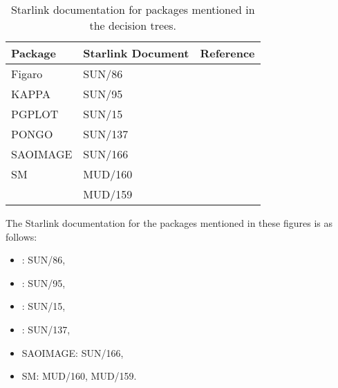 
\begin{latexonly}
\begin{table}[htbp]

\begin{center}
\begin{tabular}{llc}
Package      & Starlink Document &  Reference \\ 
\hline
Figaro       & SUN/86   & \cite{FIGARO}   \\
KAPPA        & SUN/95   & \cite{KAPPA}    \\
PGPLOT       & SUN/15   & \cite{PGPLOT}   \\
PONGO        & SUN/137  & \cite{PONGO}    \\
SAOIMAGE     & SUN/166  & \cite{SAOIMAGE} \\
SM           & MUD/160  & \cite{MUD160}   \\
             & MUD/159  & \cite{MUD159}   \\
\end{tabular}
\end{center}

\caption[Starlink documentation for packages mentioned in the decision
trees.]{Starlink documentation for packages mentioned in the decision
trees. \label{STARDOC} }

\end{table}
\end{latexonly}

\begin{htmlonly}

The Starlink documentation for the packages mentioned in these figures
is as follows:


\begin{itemize}

  \item {}:    SUN/86\cite{FIGARO},
  \item {}:     SUN/95\cite{KAPPA},
  \item {}:    SUN/15\cite{PGPLOT},
  \item {}:    SUN/137\cite{PONGO},
  \item SAOIMAGE:                  SUN/166\cite{SAOIMAGE},
  \item SM: MUD/160\cite{MUD160},  MUD/159\cite{MUD159}.

\end{itemize}

\end{htmlonly}

